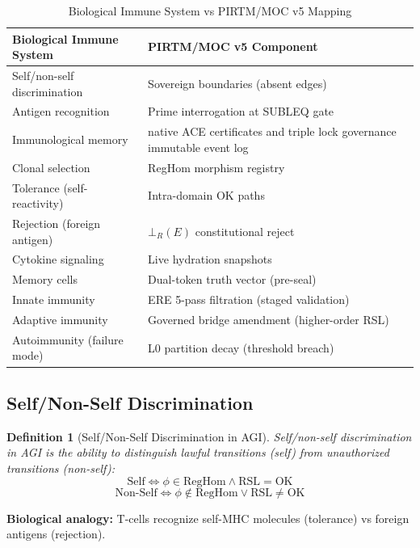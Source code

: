 \documentclass[11pt,a4paper]{article}
\newtheorem{definition}[theorem]{Definition}
\begin{document}
\begin{table}[h]
\centering
\caption{Biological Immune System vs PIRTM/MOC v5 Mapping}
\label{tab:immune_mapping}
\begin{tabular}{@{}l l@{}}
\toprule
\textbf{Biological Immune System} & \textbf{PIRTM/MOC v5 Component} \\
\midrule
Self/non-self discrimination & Sovereign boundaries (absent edges) \\
Antigen recognition & Prime interrogation at SUBLEQ gate \\
Immunological memory & native ACE certificates and triple lock governance immutable event log \\
Clonal selection & RegHom morphism registry \\
Tolerance (self-reactivity) & Intra-domain OK paths \\
Rejection (foreign antigen) & $\bot_R(E)$ constitutional reject \\
Cytokine signaling & Live hydration snapshots \\
Memory cells & Dual-token truth vector (pre-seal) \\
Innate immunity & ERE 5-pass filtration (staged validation) \\
Adaptive immunity & Governed bridge amendment (higher-order RSL) \\
Autoimmunity (failure mode) & L0 partition decay (threshold breach) \\
\bottomrule
\end{tabular}
\end{table}

\subsection{Self/Non-Self Discrimination}

\begin{definition}[Self/Non-Self Discrimination in AGI]
Self/non-self discrimination in AGI is the ability to distinguish lawful transitions (self) from unauthorized transitions (non-self):
\begin{equation}
\text{Self} \iff \phi \in \text{RegHom} \land \text{RSL} = \text{OK}
\end{equation}
\begin{equation}
\text{Non-Self} \iff \phi \notin \text{RegHom} \lor \text{RSL} \neq \text{OK}
\end{equation}
\end{definition}

\textbf{Biological analogy:} T-cells recognize self-MHC molecules (tolerance) vs foreign antigens (rejection).
\end{document}
